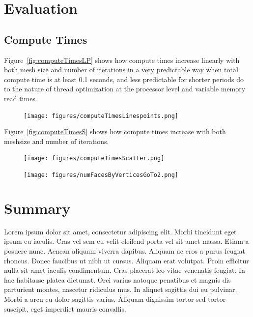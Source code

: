 \section{Evaluation}
\subsection{Compute Times}

Figure~\ref{fig:computeTimesLP} shows how compute times increase linearly with both mesh size and number of iterations in a very predictable way when total compute time is at least 0.1 seconds, and less predictable for shorter periods do to the nature of thread optimization at the processor level and variable memory read times.
\begin{figure}[ht]
	\centering
	\texttt{[image: figures/computeTimesLinespoints.png]}
\end{figure}

Figure~\ref{fig:computeTimesS} shows how compute times increase with both meshsize and number of iterations.
\begin{figure}[ht]
	\centering
	\texttt{[image: figures/computeTimesScatter.png]}
\end{figure}

\begin{figure}[ht]
	\centering
	\texttt{[image: figures/numFacesByVerticesGoTo2.png]}
\end{figure}





\section{Summary}
Lorem ipsum dolor sit amet, consectetur adipiscing elit. Morbi tincidunt eget
ipsum eu iaculis. Cras vel sem eu velit eleifend porta vel sit amet massa. Etiam
a posuere nunc. Aenean aliquam viverra dapibus. Aliquam ac eros a purus feugiat
rhoncus. Donec faucibus ut nibh ut cursus. Aliquam erat volutpat. Proin efficitur
nulla sit amet iaculis condimentum. Cras placerat leo vitae venenatis feugiat. In
hac habitasse platea dictumst. Orci varius natoque penatibus et magnis dis
parturient montes, nascetur ridiculus mus. In aliquet sagittis dui eu pulvinar.
Morbi a arcu eu dolor sagittis varius. Aliquam dignissim tortor sed tortor
suscipit, eget imperdiet mauris convallis.

